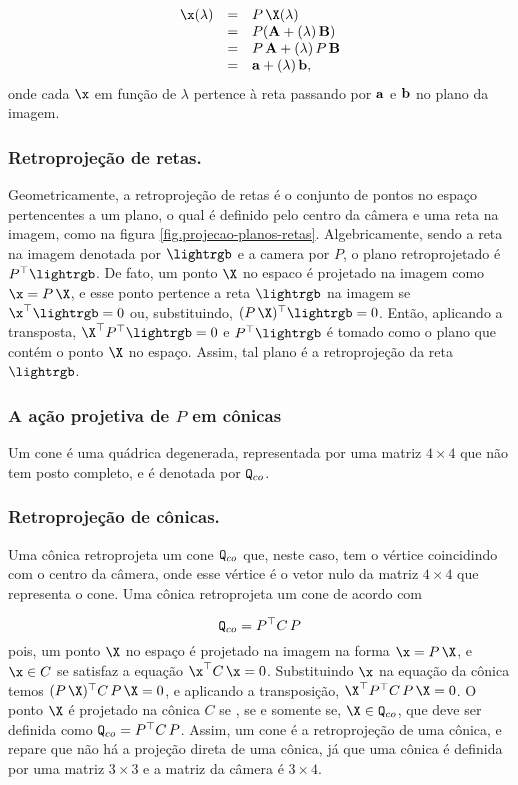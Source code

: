 \begin{equation*}
\begin{array}{rcl}
\x(\lambda)&=&P\,\X(\lambda)\\
&=&P({\bf A}+(\lambda)\,{\bf B})\\
&=&P\,{\bf A}+(\lambda)\,P\,{\bf B}\\
&=&{\bf a}+(\lambda)\,{\bf b},
\end{array}
\end{equation*}
onde cada $\x$ em função de $\lambda$ pertence à reta passando por ${\bf a}$ e ${\bf b}$ no plano da imagem.  

\subsubsection*{Retroprojeção de retas.}
Geometricamente, a retroprojeção de retas é o conjunto de pontos no espaço pertencentes a um plano, o qual é definido pelo centro da câmera e uma reta na imagem, como na figura \ref{fig.projecao-planos-retas}. Algebricamente, sendo a reta na imagem denotada por $\lightrgb$ e a camera por $P$, o plano retroprojetado é $P^\top\lightrgb$. De fato, um ponto $\X$ no espaco é projetado na imagem como $\x=P\,\X$, e esse ponto pertence a reta $\lightrgb$ na imagem se $\x^\top\lightrgb=0$ ou, substituindo, $(P\,\X)^\top\lightrgb=0$. Então, aplicando a transposta, $\X^\top P^\top\lightrgb=0$ e $P^\top\lightrgb$ é tomado como o plano que contém o ponto $\X$ no espaço. Assim, tal plano é a retroprojeção da reta $\lightrgb$.  

\subsubsection{A ação projetiva de $P$ em cônicas}
Um cone é uma quádrica degenerada, representada por uma matriz $4\times4$ que não tem posto completo, e é denotada por ${\tt Q}_{co}$.

\subsubsection*{Retroprojeção de cônicas.}
Uma cônica retroprojeta um cone ${\tt Q}_{co}$ que, neste caso, tem o vértice coincidindo com o centro da câmera, onde esse vértice é o vetor nulo da matriz $4\times4$ que representa o cone. Uma cônica retroprojeta um cone de acordo com 

\begin{equation*}
{\tt Q}_{co}=P^\top C\,P
\end{equation*}
pois, um ponto $\X$ no espaço é projetado na imagem na forma $\x=P\,\X$, e $\x\in C$ se satisfaz a equação $\x^\top C\,\x=0$. Substituindo $\x$ na equação da cônica temos $(P\,\X)^\top C\,P\,\X=0$, e aplicando a transposição, $\X^\top P^\top C\,P\,\X=0$. O ponto $\X$ é projetado na cônica $C$ se , se e somente se, $\X\in {\tt Q}_{co}$, que deve ser definida como ${\tt Q}_{co}=P^\top C\,P$. Assim, um cone é a retroprojeção de uma cônica, e repare que não há a projeção direta de uma cônica, já que uma cônica é definida por uma matriz $3\times3$ e a matriz da câmera é $3\times4$.

